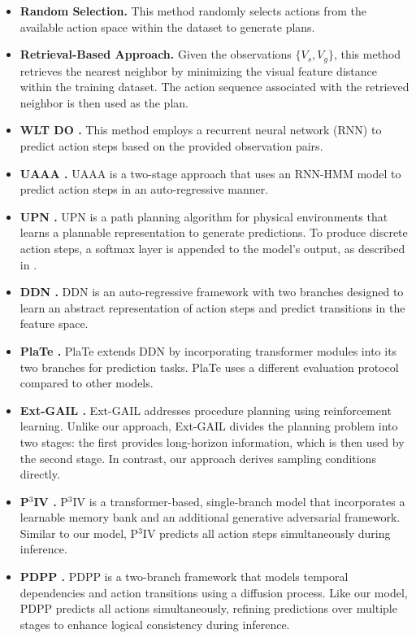 \begin{itemize}
    \item \textbf{Random Selection.} This method randomly selects actions from the available action space within the dataset to generate plans.
    \item \textbf{Retrieval-Based Approach.} Given the observations \(\{V_s, V_g\}\), this method retrieves the nearest neighbor by minimizing the visual feature distance within the training dataset. The action sequence associated with the retrieved neighbor is then used as the plan.
    \item \textbf{WLT DO \citep{ehsani2018let}.} This method employs a recurrent neural network (RNN) to predict action steps based on the provided observation pairs.
    \item \textbf{UAAA \citep{abu2019uncertainty}.} UAAA is a two-stage approach that uses an RNN-HMM model to predict action steps in an auto-regressive manner.
    \item \textbf{UPN \citep{srinivas2018universal}.} UPN is a path planning algorithm for physical environments that learns a plannable representation to generate predictions. To produce discrete action steps, a softmax layer is appended to the model's output, as described in \citep{chang2020procedure}.
    \item \textbf{DDN \citep{chang2020procedure}.} DDN is an auto-regressive framework with two branches designed to learn an abstract representation of action steps and predict transitions in the feature space.
    \item \textbf{PlaTe \citep{sun2022plate}.} PlaTe extends DDN by incorporating transformer modules into its two branches for prediction tasks. PlaTe uses a different evaluation protocol compared to other models.
    \item \textbf{Ext-GAIL \citep{bi2021procedure}.} Ext-GAIL addresses procedure planning using reinforcement learning. Unlike our approach, Ext-GAIL divides the planning problem into two stages: the first provides long-horizon information, which is then used by the second stage. In contrast, our approach derives sampling conditions directly.
    \item \textbf{P$^3$IV \citep{zhao2022p3iv}.} P$^3$IV is a transformer-based, single-branch model that incorporates a learnable memory bank and an additional generative adversarial framework. Similar to our model, P$^3$IV predicts all action steps simultaneously during inference.
    \item \textbf{PDPP \citep{wang2023pdpp}.} PDPP is a two-branch framework that models temporal dependencies and action transitions using a diffusion process. Like our model, PDPP predicts all actions simultaneously, refining predictions over multiple stages to enhance logical consistency during inference.

\end{itemize}

